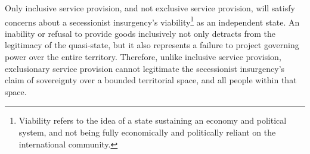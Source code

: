 \documentclass[12pt, letterpaper]{article}
\begin{document}


Only inclusive service provision, and not exclusive service provision, will satisfy concerns about a secessionist insurgency's viability\footnote{Viability refers to the idea of a state sustaining an economy and political system, and not being fully economically and politically reliant on the international community.} as an independent state. An inability or refusal to provide goods inclusively not only detracts from the legitimacy of the quasi-state, but it also represents a failure to project governing power over the entire territory. Therefore, unlike inclusive service provision, exclusionary service provision cannot legitimate the secessionist insurgency's claim of sovereignty over a bounded territorial space, and all people within that space. %
\end{document}
